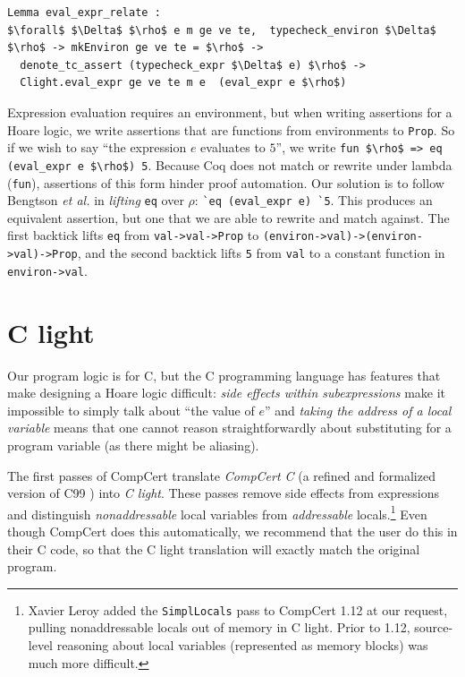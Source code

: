 \documentclass{puthesis}
\begin{document}
\begin{lstlisting}
Lemma eval_expr_relate :
$\forall$ $\Delta$ $\rho$ e m ge ve te,  typecheck_environ $\Delta$ $\rho$ -> mkEnviron ge ve te = $\rho$ ->
  denote_tc_assert (typecheck_expr $\Delta$ e) $\rho$ ->
  Clight.eval_expr ge ve te m e  (eval_expr e $\rho$)
\end{lstlisting}

Expression evaluation requires an environment, but when writing
assertions for a Hoare logic, we write assertions that are
functions from environments to \lstinline|Prop|. So if we wish to say
``the expression $e$ evaluates to $5$'', we write 
\lstinline|fun $\rho$ => eq (eval_expr e $\rho$) 5|.  Because Coq does not match or
rewrite under lambda (\lstinline|fun|), assertions of this form hinder
proof automation.  Our solution is to follow Bengtson \emph{et al.}
\cite{bengtson12:Charge} in \emph{lifting} \lstinline|eq| over $\rho$:
\lstinline|`eq (eval_expr e) `5|.  This produces an equivalent
assertion, but one that we are able to rewrite and match against. The
first backtick lifts \lstinline|eq| from \lstinline{val->val->Prop} to
\lstinline{(environ->val)->(environ->val)->Prop}, and the second
backtick lifts \lstinline{5} from \lstinline{val} to a constant
function in \lstinline{environ->val}.


\section{C light}
\label{sec:clight}
Our program logic is for C, but the C programming language has
features that make designing a Hoare logic difficult: \emph{side effects within subexpressions} 
make it impossible to simply talk about ``the value of $e$''  and \emph{taking
the address of a local variable} means that one cannot reason straightforwardly about
substituting for a program variable
(as there might be aliasing).

The first passes of CompCert translate \emph{CompCert C} (a refined
and formalized version of C99 \cite{Compcert-compiler-website}) into
\emph{C light}.  These passes remove side effects from expressions and
distinguish \emph{nonaddressable} local variables from
\emph{addressable} locals.\footnote{Xavier Leroy added the
  \lstinline|SimplLocals| pass to CompCert 1.12 at our request,
  pulling nonaddressable locals out of memory in C light.  Prior to
  1.12, source-level reasoning about local variables (represented as
  memory blocks) was much more difficult.}  Even though CompCert does
this automatically, we recommend that the user do this in their C
code, so that the C light translation will exactly match the original
program.
\end{document}
